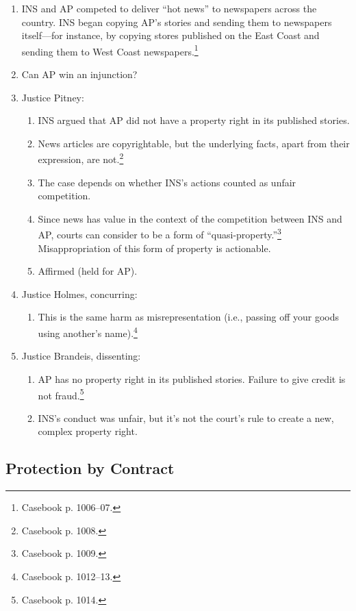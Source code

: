 \begin{enumerate}
    \item INS and AP competed to deliver ``hot news'' to newspapers across the 
    country. INS began copying AP's stories and sending them to newspapers 
    itself---for instance, by copying stores published on the East Coast and 
    sending them to West Coast newspapers.\footnote{Casebook p. 1006--07.}
    \item Can AP win an injunction?
    \item Justice Pitney:
    \begin{enumerate}
        \item INS argued that AP did not have a property right in its 
        published stories.
        \item News articles are copyrightable, but the underlying facts, apart 
        from their expression, are not.\footnote{Casebook p. 1008.}
        \item The case depends on whether INS's actions counted as unfair 
        competition.
        \item Since news has value in the context of the competition between 
        INS and AP, courts can consider to be a form of 
        ``quasi-property.''\footnote{Casebook p. 1009.} Misappropriation of 
        this form of property is actionable.
        \item Affirmed (held for AP).
    \end{enumerate}
    \item Justice Holmes, concurring:
    \begin{enumerate}
        \item This is the same harm as misrepresentation (i.e., passing off 
        your goods using another's name).\footnote{Casebook p. 1012--13.}
    \end{enumerate}
    \item Justice Brandeis, dissenting:
    \begin{enumerate}
        \item AP has no property right in its published stories. Failure to 
        give credit is not fraud.\footnote{Casebook p. 1014.}
        \item INS's conduct was unfair, but it's not the court's rule to 
        create a new, complex property right.
    \end{enumerate}
\end{enumerate}

\subsection{Protection by Contract}

